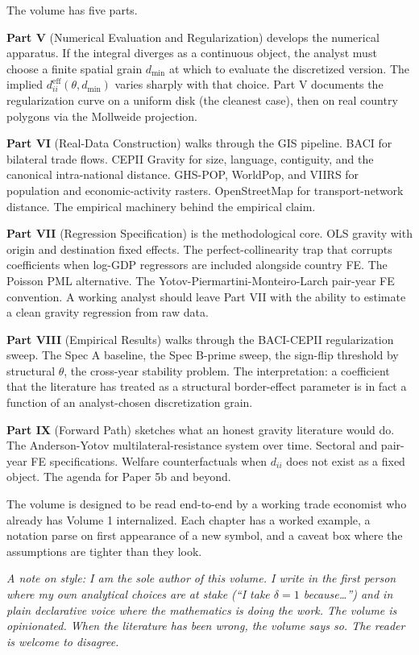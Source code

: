\documentclass[11pt,letterpaper,oneside]{book}
\theoremstyle{definition}
\theoremstyle{remark}
\newcommand{\eff}{\mathrm{eff}}
\begin{document}
The volume has five parts.

\textbf{Part V} (Numerical Evaluation and Regularization) develops the
numerical apparatus. If the integral diverges as a continuous object,
the analyst must choose a finite spatial grain $d_{\min}$ at which to
evaluate the discretized version. The implied $d_{ii}^{\eff}(\theta, d_{\min})$
varies sharply with that choice. Part V documents the regularization
curve on a uniform disk (the cleanest case), then on real country
polygons via the Mollweide projection.

\textbf{Part VI} (Real-Data Construction) walks through the GIS pipeline.
BACI for bilateral trade flows. CEPII Gravity for size, language, contiguity,
and the canonical intra-national distance. GHS-POP, WorldPop, and VIIRS for
population and economic-activity rasters. OpenStreetMap for transport-network
distance. The empirical machinery behind the empirical claim.

\textbf{Part VII} (Regression Specification) is the methodological core.
OLS gravity with origin and destination fixed effects. The perfect-collinearity
trap that corrupts coefficients when log-GDP regressors are included alongside
country FE. The Poisson PML alternative. The Yotov-Piermartini-Monteiro-Larch
pair-year FE convention. A working analyst should leave Part VII with the
ability to estimate a clean gravity regression from raw data.

\textbf{Part VIII} (Empirical Results) walks through the BACI-CEPII
regularization sweep. The Spec A baseline, the Spec B-prime sweep, the
sign-flip threshold by structural $\theta$, the cross-year stability problem.
The interpretation: a coefficient that the literature has treated as a
structural border-effect parameter is in fact a function of an
analyst-chosen discretization grain.

\textbf{Part IX} (Forward Path) sketches what an honest gravity literature
would do. The Anderson-Yotov multilateral-resistance system over time.
Sectoral and pair-year FE specifications. Welfare counterfactuals when
$d_{ii}$ does not exist as a fixed object. The agenda for Paper 5b and beyond.

The volume is designed to be read end-to-end by a working trade economist
who already has Volume 1 internalized. Each chapter has a worked example, a
notation parse on first appearance of a new symbol, and a caveat box where
the assumptions are tighter than they look.

\bigskip
{\color{dim}\itshape A note on style: I am the sole author of this volume.
I write in the first person where my own analytical choices are at stake
(``I take $\delta = 1$ because\ldots'') and in plain declarative voice where
the mathematics is doing the work. The volume is opinionated. When the
literature has been wrong, the volume says so. The reader is welcome to
disagree.}
\end{document}

